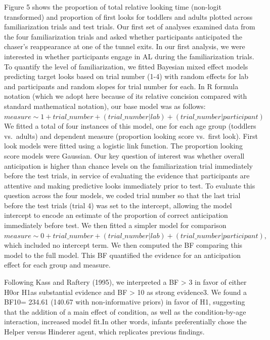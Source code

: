 \documentclass[
  english,
  man,floatsintext]{apa6}
\begin{document}
Figure 5 shows the proportion of total relative looking time (non-logit transformed) and proportion of first looks for toddlers and adults plotted across familiarization trials and test trials. Our first set of analyses examined data from the four familiarization trials and asked whether participants anticipated the chaser's reappearance at one of the tunnel exits. In our first analysis, we were interested in whether participants engage in AL during the familiarization trials. To quantify the level of familiarization, we fitted Bayesian mixed effect models predicting target looks based on trial number (1-4) with random effects for lab and participants and random slopes for trial number for each.
In R formula notation (which we adopt here because of its relative concision compared with standard mathematical notation), our base model was as follows:
\(measure \sim 1 + trial\_number + (trial\_number | lab) + (trial\_number | participant)\)
We fitted a total of four instances of this model, one for each age group (toddlers vs.~adults) and dependent measure (proportion looking score vs.~first look). First look models were fitted using a logistic link function. The proportion looking score models were Gaussian.
Our key question of interest was whether overall anticipation is higher than chance levels on the familiarization trial immediately before the test trials, in service of evaluating the evidence that participants are attentive and making predictive looks immediately prior to test. To evaluate this question across the four models, we coded trial number so that the last trial before the test trials (trial 4) was set to the intercept, allowing the model intercept to encode an estimate of the proportion of correct anticipation immediately before test. We then fitted a simpler model for comparison
\(measure \sim 0 + trial\_number + (trial\_number | lab) + (trial\_number | participant),\)
which included no intercept term. We then computed the BF comparing this model to the full model. This BF quantified the evidence for an anticipation effect for each group and measure.

Following Kass and Raftery (1995), we interpreted a BF \textgreater{} 3 in favor of either H0or H1as substantial evidence and BF \textgreater{} 10 as strong evidence3. We found a BF10= 234.61 (140.67 with non-informative priors) in favor of H1, suggesting that the addition of a main effect of condition, as well as the condition-by-age interaction, increased model fit.In other words, infants preferentially chose the Helper versus Hinderer agent, which replicates previous findings.
\end{document}
